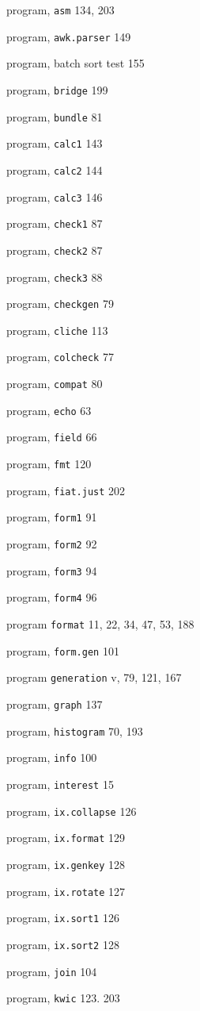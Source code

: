\begin{multicols}{3}
program, \verb'asm' 134, 203

program, \verb'awk.parser' 149

program, batch sort test 155

program, \verb'bridge' 199

program, \verb'bundle' 81

program, \verb'calc1' 143

program, \verb'calc2' 144

program, \verb'calc3' 146

program, \verb'check1' 87

program, \verb'check2' 87

program, \verb'check3' 88

program, \verb'checkgen' 79

program, \verb'cliche' 113

program, \verb'colcheck' 77

program, \verb'compat' 80

program, \verb'echo' 63

program, \verb'field' 66

program, \verb'fmt' 120

program, \verb'fiat.just' 202

program, \verb'form1' 91

program, \verb'form2' 92

program, \verb'form3' 94

program, \verb'form4' 96

program \verb'format' 11, 22, 34, 47, 53, 188

program, \verb'form.gen' 101

program \verb'generation' v, 79, 121, 167

program, \verb'graph' 137

program, \verb'histogram' 70, 193

program, \verb'info' 100

program, \verb'interest' 15

program, \verb'ix.collapse' 126

program, \verb'ix.format' 129

program, \verb'ix.genkey' 128

program, \verb'ix.rotate' 127

program, \verb'ix.sort1' 126

program, \verb'ix.sort2' 128

program, \verb'join' 104

program, \verb'kwic' 123. 203


\end{multicols}
